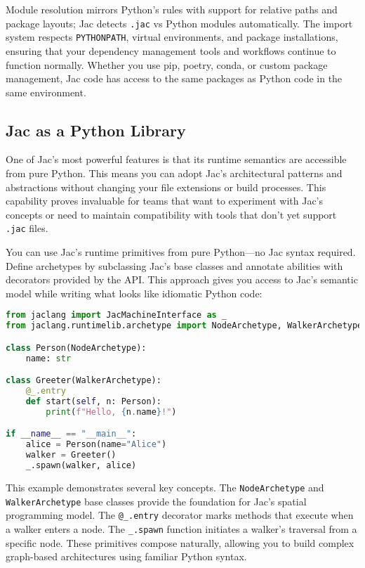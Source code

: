 Module resolution mirrors Python's rules with support for relative paths and package layouts; Jac detects \texttt{.jac} vs Python modules automatically. The import system respects \texttt{PYTHONPATH}, virtual environments, and package installations, ensuring that your dependency management tools and workflows continue to function normally. Whether you use pip, poetry, conda, or custom package management, Jac code has access to the same packages as Python code in the same environment.

\subsection{Jac as a Python Library}

One of Jac's most powerful features is that its runtime semantics are accessible from pure Python. This means you can adopt Jac's architectural patterns and abstractions without changing your file extensions or build processes. This capability proves invaluable for teams that want to experiment with Jac's concepts or need to maintain compatibility with tools that don't yet support \texttt{.jac} files.

You can use Jac's runtime primitives from pure Python—no Jac syntax required. Define archetypes by subclassing Jac's base classes and annotate abilities with decorators provided by the API. This approach gives you access to Jac's semantic model while writing what looks like idiomatic Python code:

\begin{lstlisting}[language=Python]
from jaclang import JacMachineInterface as _
from jaclang.runtimelib.archetype import NodeArchetype, WalkerArchetype

class Person(NodeArchetype):
    name: str

class Greeter(WalkerArchetype):
    @_.entry
    def start(self, n: Person):
        print(f"Hello, {n.name}!")

if __name__ == "__main__":
    alice = Person(name="Alice")
    walker = Greeter()
    _.spawn(walker, alice)
\end{lstlisting}

This example demonstrates several key concepts. The \texttt{NodeArchetype} and \texttt{WalkerArchetype} base classes provide the foundation for Jac's spatial programming model. The \texttt{@\_.entry} decorator marks methods that execute when a walker enters a node. The \texttt{\_.spawn} function initiates a walker's traversal from a specific node. These primitives compose naturally, allowing you to build complex graph-based architectures using familiar Python syntax.

